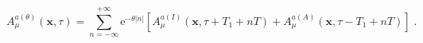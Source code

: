 \begin{equation}
\label{3-1}
A_\mu^{a(\theta)} (\boldsymbol{x}, \tau) = \sum\limits_{n=-\infty}^{+\infty}
\mathrm{e}^{-\theta|n|}\left[A_\mu^{a(I)}(\boldsymbol{x},\tau + T_1 + n T)
+ A_\mu^{a(A)}(\boldsymbol{x},\tau - T_1 + n T)\right]\;.
\end{equation}

